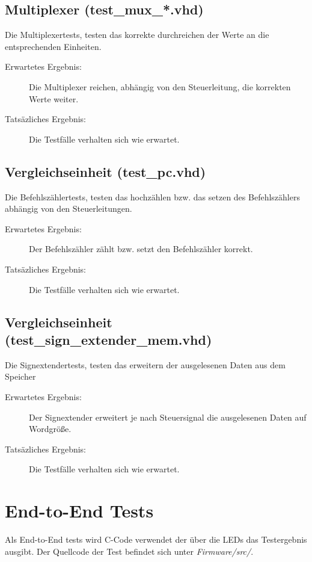         \subsection{Multiplexer (test\_mux\_*.vhd)}
            Die Multiplexertests, testen das korrekte durchreichen der Werte an die
            entsprechenden Einheiten.
            \begin{description}
                \item[Erwartetes Ergebnis:] Die Multiplexer reichen, abhängig von den Steuerleitung, die korrekten
                Werte weiter.
                \item[Tatsäzliches Ergebnis:] Die Testfälle verhalten sich wie erwartet.
            \end{description}


        \subsection{Vergleichseinheit (test\_pc.vhd)}
            Die Befehlszählertests, testen das hochzählen bzw. das setzen
            des Befehlszählers abhängig von den Steuerleitungen.
            \begin{description}
                \item[Erwartetes Ergebnis:] Der Befehlszähler zählt bzw. setzt
                den Befehlszähler korrekt. 
                \item[Tatsäzliches Ergebnis:] Die Testfälle verhalten sich wie erwartet.
            \end{description}

        \subsection{Vergleichseinheit (test\_sign\_extender\_mem.vhd)}
            Die Signextendertests, testen das erweitern der ausgelesenen Daten aus dem Speicher
            \begin{description}
                \item[Erwartetes Ergebnis:] Der Signextender erweitert je nach Steuersignal die
                ausgelesenen Daten auf Wordgröße. 
                \item[Tatsäzliches Ergebnis:] Die Testfälle verhalten sich wie erwartet.
            \end{description}

      



    \section{End-to-End Tests}
        Als End-to-End tests wird C-Code verwendet der über die LEDs das Testergebnis
        ausgibt. Der Quellcode der Test befindet sich unter \textit{Firmware/src/}.


